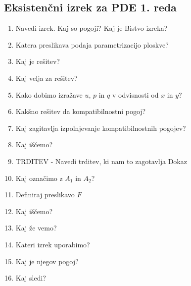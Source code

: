 \documentclass{article}
\begin{document}
    \subsection{Eksistenčni izrek za PDE 1. reda}
    \begin{enumerate}
        \item Navedi izrek. Kaj so pogoji? Kaj je Bistvo izreka?
        \item Katera preslikava podaja parametrizacijo ploskve?
        \item Kaj je rešitev?
        \item Kaj velja za rešitev?
        \item Kako dobimo izražave $u$, $p$ in $q$ v odvisnosti od $x$ in $y$?
        \item Kakšno rešitev da kompatibilnostni pogoj?
        \item Kaj zagitavlja izpolnjevanje kompatibilnostnih pogojev?
        \item Kaj iščemo?
        \item TRDITEV - Navedi trditev, ki nam to zagotavlja 
        Dokaz
        \item Kaj označimo z $A_1$ in $A_2$?
        \item Definiraj preslikavo $F$
        \item Kaj iščemo? 
        \item Kaj že vemo?
        \item Kateri izrek uporabimo?
        \item Kaj je njegov pogoj?
        \item Kaj sledi?
    \end{enumerate}
\end{document}
